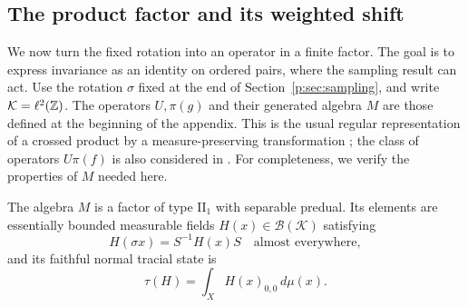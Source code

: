 \subsection{The product factor and its weighted shift}\label{p:sec:operator}

We now turn the fixed rotation into an operator in a finite factor.
The goal is to express invariance as an identity on ordered pairs,
where the sampling result can act. Use the rotation $\sigma$ fixed
at the end of Section~\ref{p:sec:sampling}, and write
$\mathcal K=\ell^2(\mathbb Z)$. The operators $U,\pi(g)$ and their generated
algebra $M$ are those defined at the beginning of the appendix.
This is the usual regular representation of a crossed product by a
measure-preserving transformation
\cite[\S1.4 and Proposition~1.4.5]{AnantharamanPopa};
the class of operators $U\pi(f)$ is also considered in
\cite[Section~5]{dykema-schultz}.
For completeness, we verify the properties of $M$ needed here.

\begin{lemma}\label{p:lem:factor}
The algebra $M$ is a factor of type $\mathrm{II}_1$ with separable
predual. Its elements are essentially bounded measurable fields
$H(x)\in\mathcal B(\mathcal K)$ satisfying
\begin{equation}\label{p:eq:covariance}
 H(\sigma x)=S^{-1}H(x)S\quad\text{almost everywhere},
\end{equation}
and its faithful normal tracial state is
\[
 \tau(H)=\int_X H(x)_{0,0}\,d\mu(x).
\]
\end{lemma}

